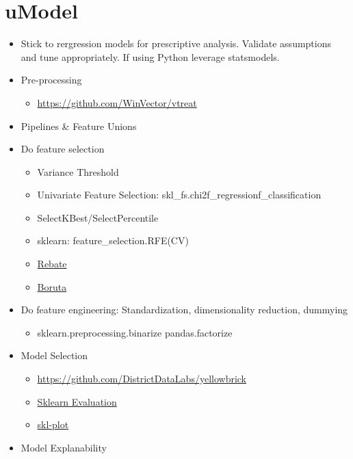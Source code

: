 \documentclass[]{book}
\providecommand{\tightlist}{%
  \setlength{\itemsep}{0pt}\setlength{\parskip}{0pt}}
\theoremstyle{definition}
\theoremstyle{definition}
\theoremstyle{definition}
\theoremstyle{remark}
\begin{document}
\section{uModel}\label{umodel}

\begin{itemize}
\item
  Stick to rergression models for prescriptive analysis. Validate
  assumptions and tune appropriately. If using Python leverage
  statsmodels.
\item
  Pre-processing

  \begin{itemize}
  \tightlist
  \item
    \url{https://github.com/WinVector/vtreat}
  \end{itemize}
\item
  Pipelines \& Feature Unions
\item
  Do feature selection

  \begin{itemize}
  \tightlist
  \item
    Variance Threshold
  \item
    Univariate Feature Selection:
    skl\_fs.chi2\textbar{}f\_regression\textbar{}f\_classification
  \item
    SelectKBest/SelectPercentile
  \item
    sklearn: feature\_selection.RFE(CV)
  \item
    \href{https://github.com/EpistasisLab/scikit-rebate}{Rebate}
  \item
    \href{https://github.com/scikit-learn-contrib/boruta_py}{Boruta}
  \end{itemize}
\item
  Do feature engineering: Standardization, dimensionality reduction,
  dummying

  \begin{itemize}
  \tightlist
  \item
    sklearn.preprocessing.binarize \textbar{} pandas.factorize
  \end{itemize}
\item
  Model Selection

  \begin{itemize}
  \tightlist
  \item
    \url{https://github.com/DistrictDataLabs/yellowbrick}
  \item
    \href{https://edublancas.github.io/sklearn-evaluation/}{Sklearn
    Evaluation}
  \item
    \href{https://github.com/reiinakano/scikit-plot}{skl-plot}
  \end{itemize}
\item
  Model Explanability


\end{itemize}
\end{document}
